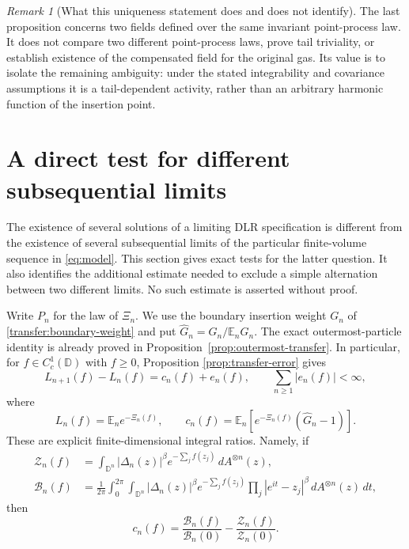 \documentclass[11pt,a4paper]{article}
\numberwithin{equation}{section}
\theoremstyle{definition}
\theoremstyle{remark}
\newtheorem{remark}[theorem]{Remark}
\newcommand{\D}{\mathbb D}
\begin{document}
\begin{remark}[What this uniqueness statement does and does not identify]
The last proposition concerns two fields defined over the same
invariant point-process law.  It does not compare two different
point-process laws, prove tail triviality, or establish existence of
the compensated field for the original gas.  Its value is to isolate
the remaining ambiguity: under the stated integrability and
covariance assumptions it is a tail-dependent activity, rather than
an arbitrary harmonic function of the insertion point.
\end{remark}

\section{A direct test for different subsequential limits}
\label{sec:boundary-insertion-nonuniqueness}

The existence of several solutions of a limiting DLR specification is
different from the existence of several subsequential limits of the
particular finite-volume sequence in \eqref{eq:model}.  This section
gives exact tests for the latter question.  It also identifies the
additional estimate needed to exclude a simple alternation between two
different limits.  No such estimate is asserted without proof.

Write $P_n$ for the law of $\Xi_n$.  We use the boundary insertion
weight $G_n$ of \eqref{transfer:boundary-weight} and put
$\widehat G_n=G_n/\mathbb E_nG_n$.  The exact outermost-particle
identity is already proved in Proposition~\ref{prop:outermost-transfer}.
In particular, for $f\in C_c^1(\D)$ with $f\geq0$, Proposition
\ref{prop:transfer-error} gives
\begin{equation}
 L_{n+1}(f)-L_n(f)=c_n(f)+e_n(f),\qquad
 \sum_{n\geq1}|e_n(f)|<\infty,
 \label{eq:boundary-covariance-summable-transfer}
\end{equation}
where
\[
 L_n(f)=\mathbb E_n e^{-\Xi_n(f)},\qquad
 c_n(f)=\mathbb E_n[e^{-\Xi_n(f)}(\widehat G_n-1)].
\]
These are explicit finite-dimensional integral ratios.  Namely, if
\begin{align*}
 \mathcal Z_n(f)&=\int_{\D^n}|\Delta_n(z)|^\beta
                    e^{-\sum_jf(z_j)}\,dA^{\otimes n}(z),\\
 \mathcal B_n(f)&=\frac1{2\pi}\int_0^{2\pi}\int_{\D^n}
       |\Delta_n(z)|^\beta e^{-\sum_jf(z_j)}
       \prod_j|e^{it}-z_j|^\beta\,dA^{\otimes n}(z)\,dt,
\end{align*}
then
\begin{equation}
 c_n(f)=\frac{\mathcal B_n(f)}{\mathcal B_n(0)}
              -\frac{\mathcal Z_n(f)}{\mathcal Z_n(0)}.
 \label{eq:explicit-boundary-covariance-ratios}
\end{equation}
\end{document}
